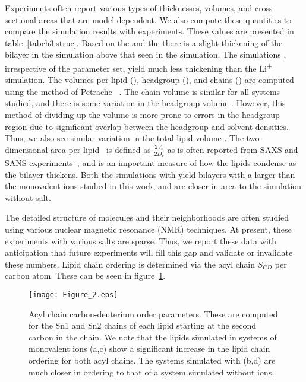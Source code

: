Experiments often report various types of thicknesses, volumes, and cross-sectional areas that are model dependent.
We also compute these quantities to compare the simulation results with experiments. These values are presented in 
table~\ref{tabch3:struc}.
Based on the \dhh{} and the \dc{} there is a slight thickening 
of the bilayer in the \li{} {simulation} above that seen in the \na{} {simulation}.
The \mg{} simulations {, irrespective of the parameter set, yield} much less thickening than {the}  
Li\textsuperscript{+} {simulation.} 
{The volumes per lipid (\vl), headgroup (\vh), and chains (\vc) are computed using the method of
Petrache \etal{}~\cite{petrache:1997}.
The chain volume \vc{} is similar for all systems studied, and there is some variation in the headgroup volume \vh{}.
However, this method of dividing up the volume is more prone to errors in the headgroup region due to 
significant overlap between the headgroup and solvent densities. 
Thus, we also see similar variation in the total lipid volume \vl{}. 
}
The two-dimensional area per lipid \al~is defined as
{$\frac{2V_c}{2D_c}$ as is often reported from SAXS and SANS experiments~\cite{nagle:2000}, and is an important
measure of how the lipids condense as the bilayer thickens.}
{Both the simulations with \mg{} yield bilayers with a larger \al{} 
    than the monovalent ions studied in this work, and are closer
in area to the simulation without salt.
}

The detailed structure of molecules and their neighborhoods are often studied using 
various nuclear magnetic resonance (NMR) techniques.
{At present, these experiments with various salts are sparse.}
{Thus,} we report these data with anticipation that future experiments will fill this gap and validate
or invalidate
these numbers.
Lipid chain ordering is determined via the acyl chain $S_{CD}$ per carbon
atom. These can be seen in figure~\ref{figch3:op}. 
\begin{figure}[H]
    \caption[Acyl chain order parameters]{Acyl chain carbon-deuterium order parameters. These are computed for the Sn1 and Sn2 chains of each lipid starting at the 
        second carbon in the chain\cite{egberts:1988,Douliez:1995}. We note that the lipids simulated in systems of monovalent ions (a,c) show a significant increase
in the lipid chain ordering for both acyl chains. The systems simulated with \mg{} (b,d) are much closer in ordering to that of a system
simulated without ions.}
    \label{figch3:op}
    \texttt{[image: Figure\_2.eps]}
\end{figure}

